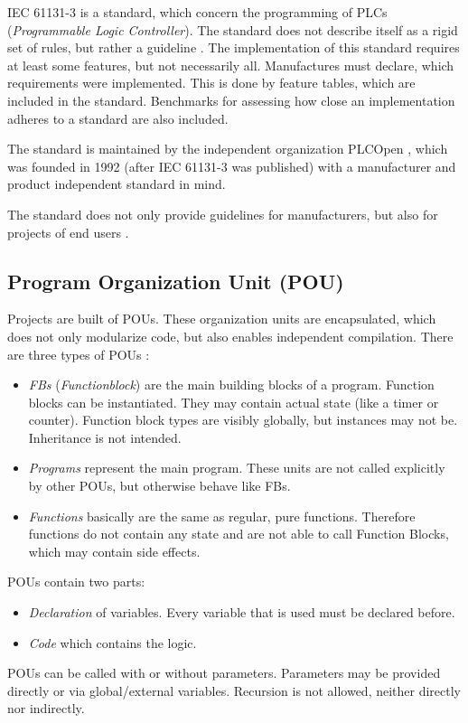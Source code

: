 IEC 61131-3 is a standard, which concern the programming of PLCs (\emph{Programmable Logic Controller}). The standard does not describe itself as a rigid set of rules, but rather a guideline \cite{johnIEC611313Programming2010}. The implementation of this standard requires at least some features, but not necessarily all. Manufactures must declare, which requirements were implemented. This is done by feature tables, which are included in the standard. Benchmarks for assessing how close an implementation adheres to a standard are also included.


The standard is maintained by the independent organization PLCOpen \cite{eldijkWhatPLCopen2018}, which was founded in 1992 (after IEC 61131-3 was published) with a manufacturer and product independent standard in mind.


The standard does not only provide guidelines for manufacturers, but also for projects of end users \cite{johnIEC611313Programming2010}.
\pagebreak
\subsection{Program Organization Unit (POU)}
\label{sub:pou}
Projects are built of POUs. These organization units are encapsulated, which does not only modularize code, but also enables independent compilation.
There are three types of POUs \cite{johnIEC611313Programming2010}:
\begin{itemize}
	\item \emph{FBs} (\emph{Functionblock}) are the main building blocks of a program. Function blocks can be instantiated. They may contain actual state (like a timer or counter). Function block types are visibly globally, but instances may not be. Inheritance is not intended.
	\item \emph{Programs} represent the main program. These units are not called explicitly by other POUs, but otherwise behave like FBs.
	\item \emph{Functions} basically are the same as regular, pure functions. Therefore functions do not contain any state and are not able to call Function Blocks, which may contain side effects. 
\end{itemize}
POUs contain two parts:
\begin{itemize}
	\item \emph{Declaration} of variables. Every variable that is used must be declared before.
	\item \emph{Code} which contains the logic. 
\end{itemize}
POUs can be called with or without parameters. Parameters may be provided directly or via global/external variables.
Recursion is not allowed, neither directly nor indirectly. 


